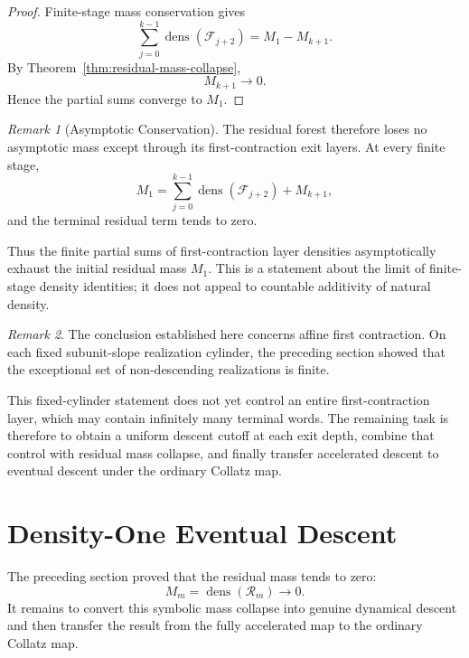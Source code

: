 \documentclass[12pt, oneside]{article}
\numberwithin{equation}{section}
\theoremstyle{definition}
\theoremstyle{plain}
\theoremstyle{remark}
\newtheorem*{remark}{Remark}
\begin{document}
\begin{proof}
Finite-stage mass conservation gives
\[
\sum_{j=0}^{k-1}
\operatorname{dens}(\mathcal F_{j+2})
=
M_1-M_{k+1}.
\]
By Theorem~\ref{thm:residual-mass-collapse},
\[
M_{k+1}\longrightarrow0.
\]
Hence the partial sums converge to \(M_1\).
\end{proof}

\begin{remark}[Asymptotic Conservation]
The residual forest therefore loses no asymptotic mass except through its
first-contraction exit layers. At every finite stage,
\[
M_1
=
\sum_{j=0}^{k-1}
\operatorname{dens}(\mathcal F_{j+2})
+
M_{k+1},
\]
and the terminal residual term tends to zero.

Thus the finite partial sums of first-contraction layer densities
asymptotically exhaust the initial residual mass \(M_1\). This is a statement
about the limit of finite-stage density identities; it does not appeal to
countable additivity of natural density.
\end{remark}

\begin{remark}
The conclusion established here concerns affine first contraction. On each
fixed subunit-slope realization cylinder, the preceding section showed that
the exceptional set of non-descending realizations is finite.

This fixed-cylinder statement does not yet control an entire
first-contraction layer, which may contain infinitely many terminal words.
The remaining task is therefore to obtain a uniform descent cutoff at each
exit depth, combine that control with residual mass collapse, and finally
transfer accelerated descent to eventual descent under the ordinary Collatz
map.
\end{remark}


\section{Density-One Eventual Descent}
\label{sec:density-one-descent}

The preceding section proved that the residual mass tends to zero:
\[
M_m=\operatorname{dens}(\mathcal R_m)\longrightarrow0.
\]
It remains to convert this symbolic mass collapse into genuine dynamical
descent and then transfer the result from the fully accelerated map to the
ordinary Collatz map.
\end{document}
